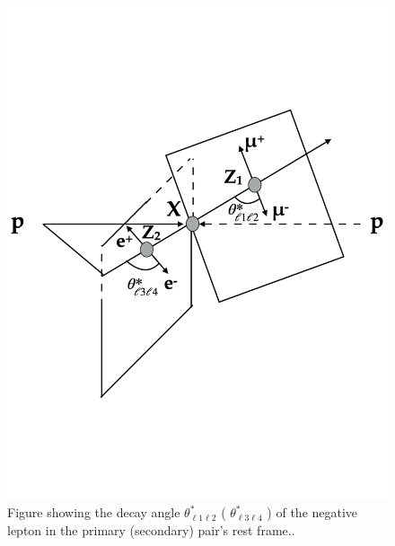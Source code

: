 \begin{figure}
\centering
\includegraphics[width=.8\linewidth]{figures/AnalysisOverview/costhetaFrameOfRef.pdf}
\caption{Figure showing the decay angle $\theta^{*}_{\ell 1 \ell 2}$ ( $\theta^{*}_{\ell 3 \ell 4}$ ) of the negative lepton in the primary (secondary) pair's rest frame.\label{fig:costhetaFrameOfRef}\cite{AngularFrameDef}.}
\end{figure}
